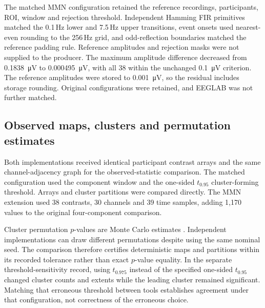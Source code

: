 The matched MMN configuration retained the reference recordings, participants, ROI, window and rejection threshold. Independent Hamming FIR primitives matched the 0.1\,Hz lower and 7.5\,Hz upper transitions, event onsets used nearest-even rounding to the 256\,Hz grid, and odd-reflection boundaries matched the reference padding rule. Reference amplitudes and rejection masks were not supplied to the producer. The maximum amplitude difference decreased from \SI{0.1838}{\micro\volt} to \SI{0.000495}{\micro\volt}, with all 38 within the unchanged \SI{0.1}{\micro\volt} criterion. The reference amplitudes were stored to \SI{0.001}{\micro\volt}, so the residual includes storage rounding. Original configurations were retained, and EEGLAB was not further matched.

\subsection*{Observed maps, clusters and permutation estimates}
Both implementations received identical participant contrast arrays and the same channel-adjacency graph for the observed-statistic comparison. The matched configuration used the component window and the one-sided \(t_{0.95}\) cluster-forming threshold. Arrays and cluster partitions were compared directly. The MMN extension used 38 contrasts, 30 channels and 39 time samples, adding 1,170 values to the original four-component comparison.

Cluster permutation \(p\)-values are Monte Carlo estimates \citep{MarisOostenveld2007}. Independent implementations can draw different permutations despite using the same nominal seed. The comparison therefore certifies deterministic maps and partitions within its recorded tolerance rather than exact \(p\)-value equality. In the separate threshold-sensitivity record, using \(t_{0.975}\) instead of the specified one-sided \(t_{0.95}\) changed cluster counts and extents while the leading cluster remained significant. Matching that erroneous threshold between tools establishes agreement under that configuration, not correctness of the erroneous choice.
